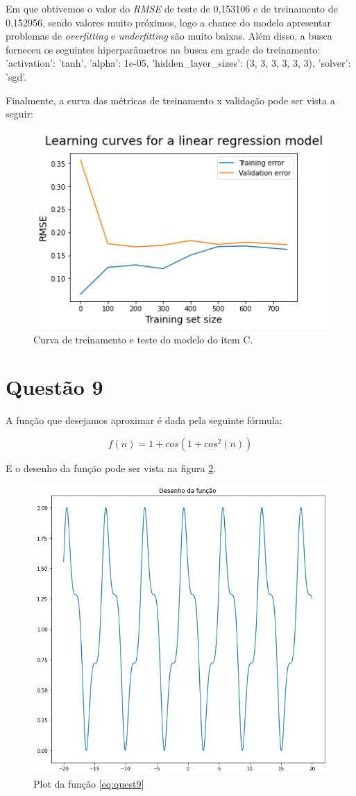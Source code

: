 \documentclass[a4paper, 12pt]{article}
\begin{document}
Em que obtivemos o valor do \textit{RMSE} de teste de 0,153106 e de treinamento de 0,152956, sendo valores muito próximos, logo a chance do modelo apresentar problemas de \textit{overfitting} e \textit{underfitting} são muito baixas. Além disso, a busca forneceu os seguintes hiperparâmetros na busca em grade do treinamento:  'activation': 'tanh', 'alpha': 1e-05, 'hidden\_layer\_sizes': (3, 3, 3, 3, 3, 3), 'solver': 'sgd'.

Finalmente, a curva das métricas de treinamento x validação pode ser vista a seguir:
\begin{figure}[h]
	\centering
 	\includegraphics[width=0.5\linewidth]{figuras/quest8c_curva.png}
    \caption{Curva de treinamento e teste do modelo do item C.}
    \label{fig:quest8c_curva}
\end{figure}
\FloatBarrier


\section{Questão 9}

A função que desejamos aproximar é dada pela seguinte fórmula:

\begin{equation}\label{eq:quest9}
f(n) = 1+cos(1+cos^2(n))
\end{equation}


E o desenho da função pode ser vista na figura \ref{fig:quest9_original_plot}.

\begin{figure}[h]
	\centering
	\includegraphics[width=0.7\linewidth]{figuras/quest9_original_plot}
    \caption{Plot da função \ref{eq:quest9}}
    \label{fig:quest9_original_plot}
\end{figure}
\FloatBarrier
\end{document}

